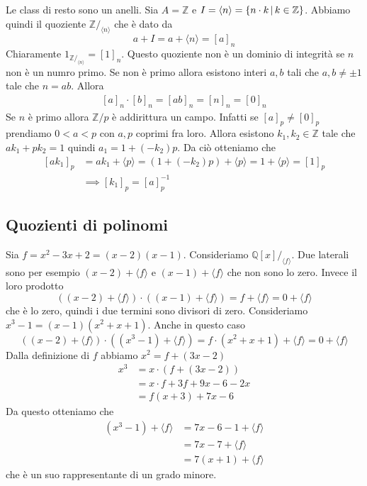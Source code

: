 \documentclass[a4paper]{article}
\begin{document}
Le class di resto sono un anelli.
Sia \(A = \mathbb{Z}\) e \(I = \langle n \rangle = \{n \cdot k
\,|\, k \in \mathbb{Z}\}\).
Abbiamo quindi il quoziente \(\mathbb{Z}/_{\langle n \rangle}\) che è dato da
\[
    a+I = a+\langle n \rangle = {[a]}_n
\]
Chiaramente \(1_{\mathbb{Z}/_{\langle n \rangle}} = {[1]}_n\).
Questo quoziente non è un dominio di integrità se \(n\) non è un numro primo.
Se non è primo allora esistono interi \(a,b\)
tali che \(a,b \neq \pm 1\)
tale che \(n=ab\). Allora
\begin{align*}
    {[a]}_n \cdot {[b]}_n = {[ab]}_n = {[n]}_n = {[0]}_n
\end{align*}
Se \(n\) è primo allora \(\mathbb{Z}/p\) è addirittura un campo.
Infatti se \({[a]}_p \neq {[0]}_p\)
prendiamo \(0 < a < p\) con \(a,p\) coprimi fra loro.
Allora esistono \(k_1, k_2 \in \mathbb{Z}\)
tale che \(ak_1 + pk_2 = 1\)
quindi \(a_1 = 1 + (-k_2)p\).
Da ciò otteniamo che
\begin{align*}
    {[ak_1]}_p &= ak_1 + \langle p \rangle = \left(1 + (-k_2)p\right)
    + \langle p \rangle
    = 1 + \langle p \rangle = {[1]}_p \\
    &\implies {[k_1]}_p = {[a]}_p^{-1}
\end{align*}

\subsection{Quozienti di polinomi}

Sia \(f = x^2 - 3x + 2 = (x-2)(x-1)\).
Consideriamo \(\mathbb{Q}[x]/_{\langle f \rangle}\).
Due laterali sono per esempio \((x-2) + \langle f \rangle\)
e \((x-1) + \langle f \rangle\) che non sono lo zero.
Invece il loro prodotto
\[
    \left((x-2) + \langle f \rangle\right) \cdot
    \left((x-1) + \langle f \rangle\right)
    = f + \langle f \rangle = 0 + \langle f \rangle
\]
che è lo zero, quindi i due termini sono divisori di zero.
Consideriamo \(x^3 - 1 = (x-1)(x^2 + x + 1)\).
Anche in questo caso
\[
    \left((x-2) + \langle f \rangle\right) \cdot
    \left((x^3 - 1) + \langle f \rangle\right) = f \cdot (x^2 + x +
    1) + \langle f \rangle = 0 + \langle f \rangle
\]
Dalla definizione di \(f\) abbiamo \(x^2 = f + (3x-2)\)
\begin{align*}
    x^3 &= x \cdot (f + (3x-2)) \\
    &= x \cdot f + 3f + 9x-6-2x \\
    &= f(x+3) + 7x-6
\end{align*}
Da questo otteniamo che
\begin{align*}
    (x^3 - 1) + \langle f \rangle &= 7x-6 - 1 + \langle f \rangle \\
    &= 7x-7 + \langle f \rangle \\
    &= 7(x+1) + \langle f \rangle
\end{align*}
che è un suo rappresentante di un grado minore.
\end{document}
